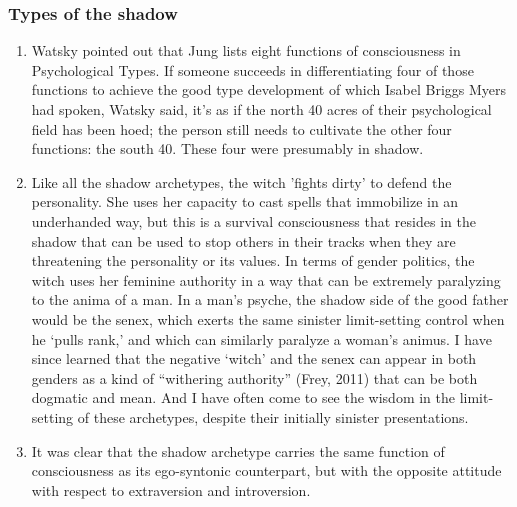 \subsubsection{Types of the shadow}

\begin{enumerate}

    \item {}
        Watsky pointed out that Jung lists eight functions of consciousness in
        Psychological Types. If someone succeeds in differentiating four of
        those functions to achieve the good type development of which Isabel
        Briggs Myers had spoken, Watsky said, it’s as if the north 40 acres of
        their psychological field has been hoed; the person still needs to
        cultivate the other four functions: the south 40. These four were
        presumably in shadow.

    \item {} Like all the shadow archetypes, the witch
        'fights dirty' to defend the personality. She uses her capacity to cast
        spells that immobilize in an underhanded way, but this is a survival
        consciousness that resides in the shadow that can be used to stop
        others in their tracks when they are threatening the personality or its
        values. In terms of gender politics, the witch uses her feminine
        authority in a way that can be extremely paralyzing to the anima of a
        man. In a man’s psyche, the shadow side of the good father would be the
        senex, which exerts the same sinister limit-setting control when he
        ‘pulls rank,’ and which can similarly paralyze a woman’s animus. I have
        since learned that the negative ‘witch’ and the senex can appear in
        both genders as a kind of “withering authority” (Frey, 2011) that can
        be both dogmatic and mean. And I have often come to see the wisdom in
        the limit-setting of these archetypes, despite their initially sinister
        presentations.

    \item {} It was clear
        that the shadow archetype carries the same function of consciousness as
        its ego-syntonic counterpart, but with the opposite attitude with
        respect to extraversion and introversion.


\end{enumerate}
